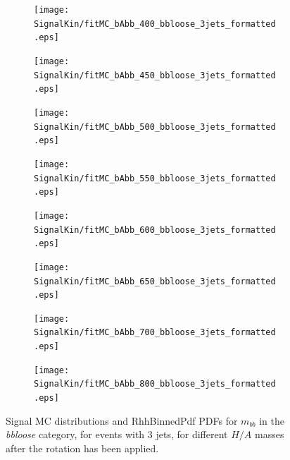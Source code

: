 \begin{figure}[phtb!]
  \begin{center}
  \begin{subfigure}[$m_{A}=400$ GeV]{0.4\textwidth}\texttt{[image: SignalKin/fitMC\_bAbb\_400\_bbloose\_3jets\_formatted.eps]}\end{subfigure}
  \begin{subfigure}[$m_{A}=450$ GeV]{0.4\textwidth}\texttt{[image: SignalKin/fitMC\_bAbb\_450\_bbloose\_3jets\_formatted.eps]}\end{subfigure}
  \begin{subfigure}[$m_{A}=500$ GeV]{0.4\textwidth}\texttt{[image: SignalKin/fitMC\_bAbb\_500\_bbloose\_3jets\_formatted.eps]}\end{subfigure}
  \begin{subfigure}[$m_{A}=550$ GeV]{0.4\textwidth}\texttt{[image: SignalKin/fitMC\_bAbb\_550\_bbloose\_3jets\_formatted.eps]}\end{subfigure}
  \begin{subfigure}[$m_{A}=600$ GeV]{0.4\textwidth}\texttt{[image: SignalKin/fitMC\_bAbb\_600\_bbloose\_3jets\_formatted.eps]}\end{subfigure}
  \begin{subfigure}[$m_{A}=650$ GeV]{0.4\textwidth}\texttt{[image: SignalKin/fitMC\_bAbb\_650\_bbloose\_3jets\_formatted.eps]}\end{subfigure}
  \begin{subfigure}[$m_{A}=700$ GeV]{0.4\textwidth}\texttt{[image: SignalKin/fitMC\_bAbb\_700\_bbloose\_3jets\_formatted.eps]}\end{subfigure}
  \begin{subfigure}[$m_{A}=800$ GeV]{0.4\textwidth}\texttt{[image: SignalKin/fitMC\_bAbb\_800\_bbloose\_3jets\_formatted.eps]}\end{subfigure}
  \caption{Signal MC distributions and RhhBinnedPdf PDFs for $m_{bb}$ in the {\it bbloose} category, for events with 3 jets, for different $H/A$ masses after the rotation has been applied.\label{fig:signalPDFs_3j_bbloose}} 
    \end{center}
\end{figure}


